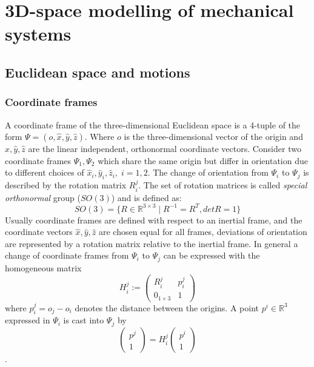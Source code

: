 \documentclass[a4paper,twoside, openright,12pt]{report}
\begin{document}
\section{3D-space modelling of mechanical systems}\label{S:3Dspace-modelling}


\subsection{Euclidean space and motions}\label{[SS:euclideanspacemotions]}
\subsubsection{Coordinate frames}
A coordinate frame of the three-dimensional Euclidean space is a 4-tuple of the form $ \Psi = (o,\hat{x},\hat{y},\hat{z})$. Where $ o $ is the three-dimensional vector of the origin and $ \hat{x},\hat{y},\hat{z} $ are the linear independent, orthonormal coordinate vectors. Consider two coordinate frames $ \Psi_1,\Psi_2 $ which share the same origin but differ in orientation due to different choices of $ \hat{x}_i,\hat{y}_i,\hat{z}_i, \; i=1,2 $. The change of orientation from $ \Psi_i $ to $ \Psi_j $ is described by the rotation matrix $ R_i^j $. The set of rotation matrices is called \emph{special orthonormal} group ($SO(3)$) \cite{Stramigioli_01b} and is defined as:
\begin{equation}
	SO(3) = \{R \in \mathbb{R}^{3 \times 3} \; | \; R^{-1} = R^T, det R = 1\}
\end{equation}
Usually coordinate frames are defined with respect to an inertial frame, and the coordinate vectors $ \hat{x},\hat{y},\hat{z} $ are chosen equal for all frames, deviations of orientation are represented by a rotation matrix relative to the inertial frame. In general a change of coordinate frames from $ \Psi_i $ to $ \Psi_j $ can be expressed with the homogeneous matrix
\[ H_i^j := \begin{pmatrix}R_i^j & p_i^j \\ 0_{1\times3} & 1\end{pmatrix} \]
where $p_i^j = o_j - o_i$ denotes the distance between the origins. A point $ p^i \in \mathbb{R}^3 $ expressed in $ \Psi_i $ is cast into $\Psi_j$ by
\begin{equation}\label{EQ:coordchange}
	\begin{pmatrix}p^j \\ 1\end{pmatrix} = H_i^j \begin{pmatrix}
		p^i \\ 1\end{pmatrix}
\end{equation}.
\end{document}
